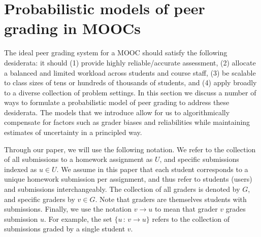 \section{Probabilistic models of peer grading in MOOCs}
The ideal peer grading system for a MOOC should satisfy the following desiderata: it should (1) provide
highly reliable/accurate assessment, (2) allocate a balanced
and limited workload across students and course staff, (3)
be scalable to class sizes of tens or hundreds of thousands
of students, and (4) apply broadly to a diverse collection of
problem settings. 
In this section we discuss a number of ways to formulate a
probabilistic model of peer grading to address these desiderata. The models 
that we introduce allow for
us to algorithmically compensate for factors such as grader
biases and reliabilities while maintaining estimates of uncertainty in a principled way. 


Through our paper, we will use the following notation.
We refer to the collection of all submissions to a homework assignment as $U$, and specific submissions
indexed as $u\in U$.  We assume in this paper that each student corresponds to a unique homework submission
per assignment, and thus refer to students (users) and submissions interchangeably.
The collection of all graders is denoted by $G$, and specific graders
by $v\in G$.   Note that graders are themselves students with submissions.
Finally, we use the notation $v\rightarrow u$ to mean that grader $v$ grades submission $u$.  For example,
the set $\{u\,:\,v\rightarrow u\}$ refers to the collection of submissions graded by a single student $v$.

